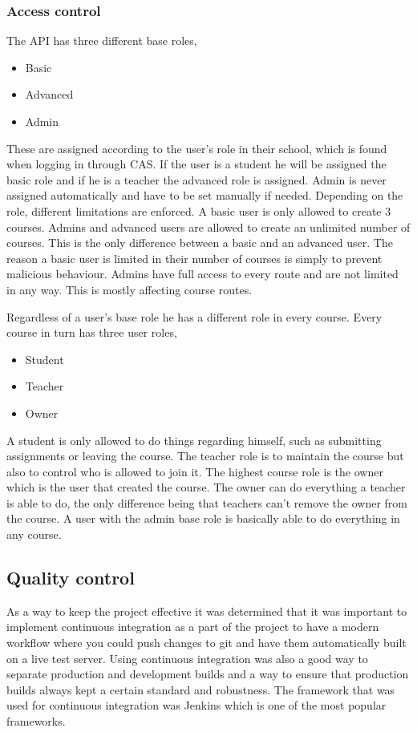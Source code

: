 \subsubsection{Access control}
The API has three different base roles, 
\begin{itemize}
\item Basic
\item Advanced
\item Admin
\end{itemize}

These are assigned according to the user's role in their school, which is found when logging in through CAS. If the user is a student he will be assigned the basic role and if he is a teacher the advanced role is assigned. Admin is never assigned automatically and have to be set manually if needed. Depending on the role, different limitations are enforced. A basic user is only allowed to create 3 courses. Admins and advanced users are allowed to create an unlimited number of courses. This is the only difference between a basic and an advanced user. The reason a basic user is limited in their number of courses is simply to prevent malicious behaviour. Admins have full access to every route and are not limited in any way. This is mostly affecting course routes. 

Regardless of a user's base role he has a different role in every course. Every course in turn has three user roles,
\begin{itemize}
\item Student
\item Teacher
\item Owner
\end{itemize}
A student is only allowed to do things regarding himself, such as submitting assignments or leaving the course. The teacher role is to maintain the course but also to control who is allowed to join it. The highest course role is the owner which is the user that created the course. The owner can do everything a teacher is able to do, the only difference being that teachers can't remove the owner from the course. A user with the admin base role is basically able to do everything in any course.

\subsection{Quality control}
As a way to keep the project effective it was determined that it was important to implement continuous integration as a part of the project to have a modern workflow where you could push changes to git and have them automatically built on a live test server. Using continuous integration was also a good way to separate production and development builds and a way to ensure that production builds always kept a certain standard and robustness. The framework that was used for continuous integration was Jenkins which is one of the most popular frameworks.

